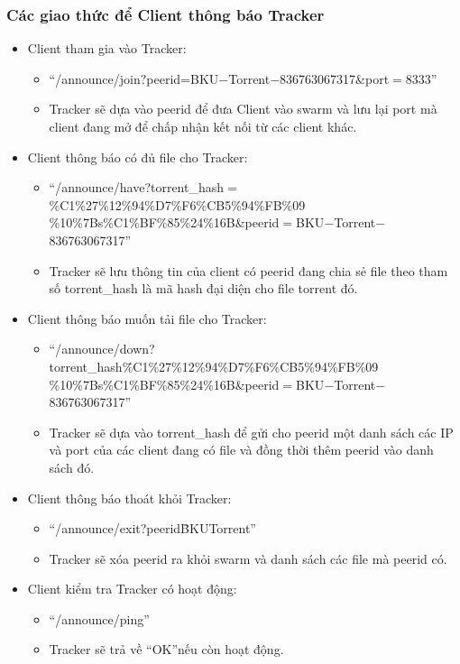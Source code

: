 \documentclass[a4paper]{article}
\begin{document}
    \subsubsection{Các giao thức để Client thông báo Tracker}
    \begin{itemize}
        \item Client tham gia vào Tracker:
        \begin{itemize}
            \item \textquotedblleft/announce/join$?$peerid=BKU$-$Torrent$-$836763067317\&port$=$8333\textquotedblright
            \item Tracker sẽ dựa vào peerid để đưa Client vào swarm và lưu lại port mà client đang mở để chấp nhận kết nối từ các client khác.
        \end{itemize}
        \item Client thông báo có đủ file cho Tracker:
        \begin{itemize}
            \item \textquotedblleft/announce/have?torrent\_hash$=$\%C1\%27\%12\%94\%D7\%F6\%CB5\%94\%FB\%09 \%10\%7Bs\%C1\%BF\%85\%24\%16B\&peerid$=$BKU$-$Torrent$-$836763067317\textquotedblright
            \item Tracker sẽ lưu thông tin của client có peerid đang chia sẻ file theo tham số torrent\_hash là mã hash đại diện cho file torrent đó.
        \end{itemize}
        \item Client thông báo muốn tải file cho Tracker:
        \begin{itemize}
            \item \textquotedblleft/announce/down?torrent\_hash\=\%C1\%27\%12\%94\%D7\%F6\%CB5\%94\%FB\%09 \%10\%7Bs\%C1\%BF\%85\%24\%16B\&peerid$=$BKU$-$Torrent$-$836763067317\textquotedblright
            \item Tracker sẽ dựa vào torrent\_hash để gửi cho peerid một danh sách các IP và port của các client đang có file và đồng thời thêm peerid vào danh sách đó.
        \end{itemize}
        \item Client thông báo thoát khỏi Tracker:
        \begin{itemize}
            \item \textquotedblleft/announce/exit?peerid\=BKU\-Torrent\textquotedblright
            \item Tracker sẽ xóa peerid ra khỏi swarm và danh sách các file mà peerid có.
        \end{itemize}
        \item Client kiểm tra Tracker có hoạt động:
        \begin{itemize}
            \item \textquotedblleft/announce/ping\textquotedblright
            \item Tracker sẽ trả về \textquotedblleft OK\textquotedblright nếu còn hoạt động.
        \end{itemize}
    \end{itemize}
\end{document}
